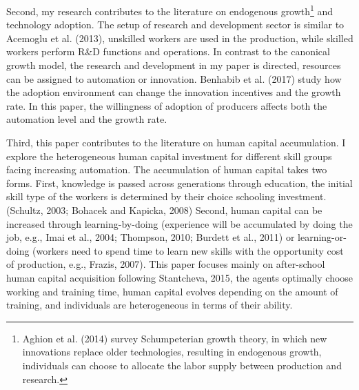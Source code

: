 \documentclass[12pt]{article}
\begin{document}
Second, my research contributes to the literature on endogenous growth\footnote{Aghion et al. (2014)\nocite{Aghionetal2014} survey Schumpeterian growth theory, in which new innovations replace older technologies, resulting in endogenous growth, individuals can choose to allocate the labor supply between production and research.} and technology adoption. The setup of research and development sector is similar to Acemoglu et al. (2013)\nocite{Acemogluetal2013}, unskilled workers are used in the production, while skilled workers perform R\&D functions and operations. In contrast to the canonical growth model, the research and development in my paper is directed, resources can be assigned to automation or innovation. Benhabib et al. (2017)\nocite{Benhabibetal2017} study how the adoption environment can change the innovation incentives and the growth rate. In this paper, the willingness of adoption of producers affects both the automation level and the growth rate. 

Third, this paper contributes to the literature on human capital accumulation. I explore the heterogeneous human capital investment for different skill groups facing increasing automation. The accumulation of human capital takes two forms. First, knowledge is passed across generations through education, the initial skill type of the workers is determined by their choice schooling investment. (Schultz, 2003\nocite{Schultz2003}; Bohacek and Kapicka, 2008\nocite{BohacekKapicka2008}) Second, human capital can be increased through learning-by-doing (experience will be accumulated by doing the job, e.g., Imai et al., 2004\nocite{Imaietal2004}; Thompson, 2010\nocite{Thompson2010}; Burdett et al., 2011\nocite{Burdettetal2011}) or learning-or-doing (workers need to spend time to learn new skills with the opportunity cost of production, e.g., Frazis, 2007\nocite{Frazis2007}). This paper focuses mainly on after-school human capital acquisition following Stantcheva, 2015\nocite{Stantcheva2015}, the agents optimally choose working and training time, human capital evolves depending on the amount of training, and individuals are heterogeneous in terms of their ability. 
\end{document}
